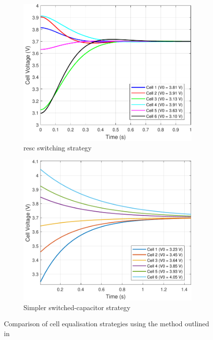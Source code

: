 \begin{figure}[H]
    \centering
    \vspace{5mm}
    \begin{subfigure}[b]{0.4\textwidth} %
        \centering
        \includegraphics[width=\textwidth]{figs/Samuel/Figures/cellV-cropped.pdf}
        \caption{\gls{resc} switching strategy}
        \label{fig:resccrop}
    \end{subfigure}
    \hspace{0.07\textwidth}
    \begin{subfigure}[b]{0.388\textwidth} %
        \centering
        \includegraphics[width=\textwidth]{figs/Samuel/Figures/recpdf-cropped.pdf}
        \caption{Simpler switched-capacitor strategy}
        \label{fig:reccrop}
    \end{subfigure}
    \caption[Comparison of Cell Equalisation Strategies]{Comparison of cell equalisation strategies using the method outlined in \cite{8467638}}
    \label{fig:rescvrec}
\end{figure}

